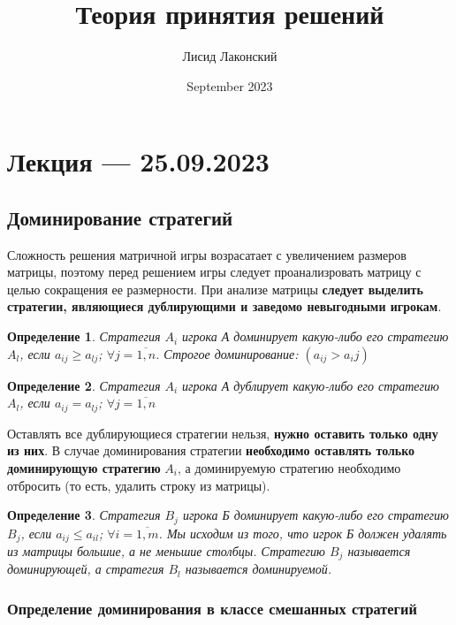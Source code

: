\documentclass{article}
\title{Теория принятия решений}
\author{Лисид Лаконский}
\date{September 2023}
\newtheorem{definition}{Определение}
\begin{document}
\raggedright

\maketitle

\tableofcontents
\pagebreak

\section{Лекция — 25.09.2023}

\subsection{Доминирование стратегий}

Сложность решения матричной игры возрасатает с увеличением размеров матрицы, поэтому перед решением игры следует проанализровать матрицу с целью сокращения ее размерности. При анализе матрицы \textbf{следует выделить стратегии, являющиеся дублирующими и заведомо невыгодными игрокам}.

\begin{definition}
    Стратегия $A_{i}$ игрока А доминирует какую-либо его стратегию $A_{l}$, если $a_{i j} \ge a_{l j}$; $\forall j = \overline{1, n}$.
    Строгое доминирование: $(a_{i j} > a_i j)$
\end{definition}

\begin{definition}
    Стратегия $A_{i}$ игрока А дублирует какую-либо его стратегию $A_{l}$, если $a_{i j} = a_{l j}$; $\forall j = \overline{1, n}$
\end{definition}

Оставлять все дублирующиеся стратегии нельзя, \textbf{нужно оставить только одну из них}. В случае доминирования стратегии \textbf{необходимо оставлять только доминирующую стратегию} $A_{i}$, а доминируемую стратегию необходимо отбросить (то есть, удалить строку из матрицы).

\begin{definition}
    Стратегия $B_{j}$ игрока Б доминирует какую-либо его стратегию $B_{j}$, если $a_{i j} \le a_{i l}$; $\forall i = \overline{1, m}$. Мы исходим из того, что игрок Б должен удалять из матрицы большие, а не меньшие столбцы. Стратегию $B_{j}$ называется доминирующей, а стратегия $B_{l}$ называется доминируемой.
\end{definition}

\subsubsection{Определение доминирования в классе смешанных стратегий}
\end{document}
